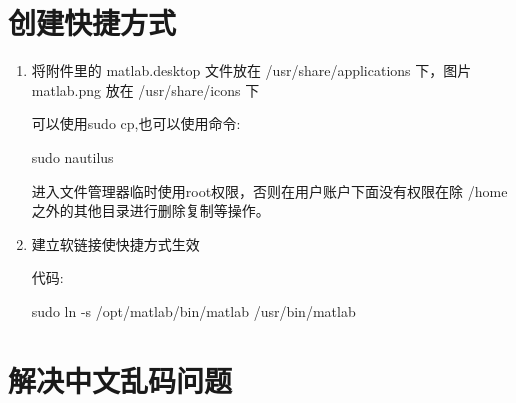 \documentclass[12pt]{article}
\begin{document}
\section{创建快捷方式}

\begin{enumerate}
\item 将附件里的  matlab.desktop  文件放在  /usr/share/applications  下，图片  matlab.png  放在  /usr/share/icons  下

可以使用sudo  cp,也可以使用命令:

sudo  nautilus

进入文件管理器临时使用root权限，否则在用户账户下面没有权限在除  /home  之外的其他目录进行删除复制等操作。

\item 建立软链接使快捷方式生效

代码:

sudo  ln  -s  /opt/matlab/bin/matlab    /usr/bin/matlab

\end{enumerate}

\section{解决中文乱码问题}
\end{document}
